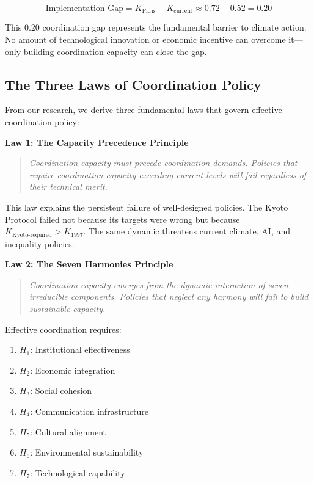 \documentclass[12pt,letterpaper]{article}
\newcommand{\Kparis}{K_{\text{Paris}}}
\begin{document}
\begin{equation}
\text{Implementation Gap} = \Kparis - K_{\text{current}} \approx 0.72 - 0.52 = 0.20
\end{equation}

This 0.20 coordination gap represents the fundamental barrier to climate action. No amount of technological innovation or economic incentive can overcome it---only building coordination capacity can close the gap.

\subsection{The Three Laws of Coordination Policy}

From our research, we derive three fundamental laws that govern effective coordination policy:

\textbf{Law 1: The Capacity Precedence Principle}
\begin{quote}
\textit{Coordination capacity must precede coordination demands. Policies that require coordination capacity exceeding current levels will fail regardless of their technical merit.}
\end{quote}

This law explains the persistent failure of well-designed policies. The Kyoto Protocol failed not because its targets were wrong but because $K_{\text{Kyoto-required}} > K_{\text{1997}}$. The same dynamic threatens current climate, AI, and inequality policies.

\textbf{Law 2: The Seven Harmonies Principle}
\begin{quote}
\textit{Coordination capacity emerges from the dynamic interaction of seven irreducible components. Policies that neglect any harmony will fail to build sustainable capacity.}
\end{quote}

Effective coordination requires:
\begin{enumerate}
    \item $H_1$: Institutional effectiveness
    \item $H_2$: Economic integration
    \item $H_3$: Social cohesion
    \item $H_4$: Communication infrastructure
    \item $H_5$: Cultural alignment
    \item $H_6$: Environmental sustainability
    \item $H_7$: Technological capability
\end{enumerate}
\end{document}
